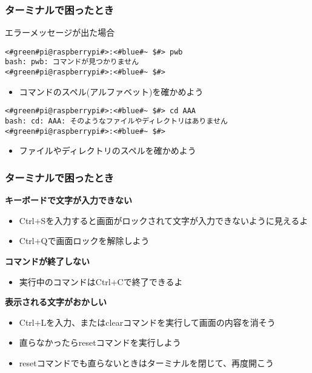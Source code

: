 \begin{frame}[fragile]
    \frametitle{ターミナルで困ったとき}
    エラーメッセージが出た場合
    \begin{lstlisting}
<#green#pi@raspberrypi#>:<#blue#~ $#> pwb
bash: pwb: コマンドが見つかりません
<#green#pi@raspberrypi#>:<#blue#~ $#> 
        \end{lstlisting}
    \begin{itemize}
        \item コマンドのスペル(アルファベット)を確かめよう
    \end{itemize}
    \begin{lstlisting}
<#green#pi@raspberrypi#>:<#blue#~ $#> cd AAA
bash: cd: AAA: そのようなファイルやディレクトリはありません
<#green#pi@raspberrypi#>:<#blue#~ $#> 
        \end{lstlisting}
    \begin{itemize}
        \item ファイルやディレクトリのスペルを確かめよう
    \end{itemize}
\end{frame}

\begin{frame}
    \frametitle{ターミナルで困ったとき}
    {\bf キーボードで文字が入力できない}
    \begin{itemize}
        \item Ctrl+Sを入力すると画面がロックされて文字が入力できないように見えるよ
        \item Ctrl+Qで画面ロックを解除しよう
    \end{itemize}
    {\bf コマンドが終了しない}
    \begin{itemize}
        \item 実行中のコマンドはCtrl+Cで終了できるよ
    \end{itemize}
    {\bf 表示される文字がおかしい}
    \begin{itemize}
        \item Ctrl+Lを入力、またはclearコマンドを実行して画面の内容を消そう
        \item 直らなかったらresetコマンドを実行しよう
        \item resetコマンドでも直らないときはターミナルを閉じて、再度開こう
    \end{itemize}
\end{frame}

